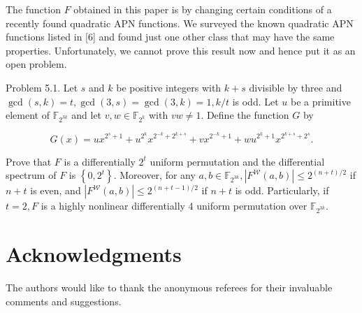 \documentclass[10pt]{article}
\begin{document}
The function $F$ obtained in this paper is by changing certain conditions of a recently found quadratic APN functions. We surveyed the known quadratic APN functions listed in [6] and found just one other class that may have the same properties. Unfortunately, we cannot prove this result now and hence put it as an open problem.

Problem 5.1. Let $s$ and $k$ be positive integers with $k+s$ divisible by three and $\operatorname{gcd}(s, k)=t, \operatorname{gcd}(3, s)= \operatorname{gcd}(3, k)=1, k / t$ is odd. Let $u$ be a primitive element of $\mathbb{F}_{2^{3 k}}$ and let $v, w \in \mathbb{F}_{2^{k}}$ with $v w \neq 1$. Define the function $G$ by

$$
G(x)=u x^{2^{s}+1}+u^{2^{k}} x^{2^{-k}+2^{k+s}}+v x^{2^{-k}+1}+w u^{2^{k}+1} x^{2^{k+s}+2^{s}} .
$$

Prove that $F$ is a differentially $2^{t}$ uniform permutation and the differential spectrum of $F$ is $\left\{0,2^{t}\right\}$. Moreover, for any $a, b \in \mathbb{F}_{2^{3 k}},\left|F^{\mathcal{W}}(a, b)\right| \leqslant 2^{(n+t) / 2}$ if $n+t$ is even, and $\left|F^{\mathcal{W}}(a, b)\right| \leqslant 2^{(n+t-1) / 2}$ if $n+t$ is odd. Particularly, if $t=2, F$ is a highly nonlinear differentially 4 uniform permutation over $\mathbb{F}_{2^{3 k}}$.

\section*{Acknowledgments}
The authors would like to thank the anonymous referees for their invaluable comments and suggestions.
\end{document}
